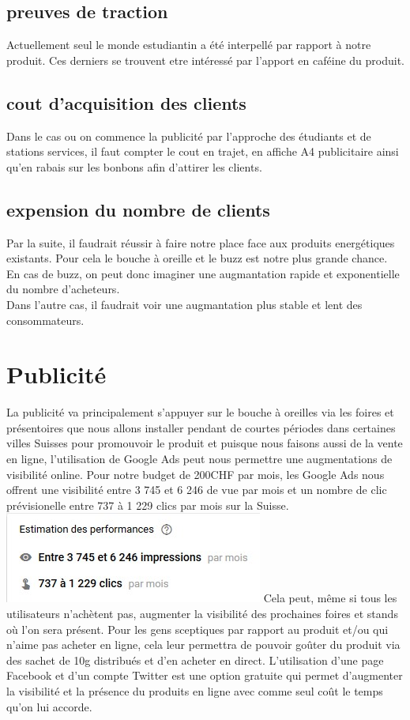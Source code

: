\documentclass[12pt]{article}
\begin{document}
\subsection{preuves de traction}
Actuellement seul le monde estudiantin a été interpellé par rapport à notre produit. Ces derniers se trouvent etre intéressé par l'apport en caféine du produit.
\subsection{cout d'acquisition des clients}
Dans le cas ou on commence la publicité par l'approche des étudiants et de stations services, il faut compter le cout en trajet, en affiche A4 publicitaire ainsi qu'en rabais sur les bonbons afin d'attirer les clients.

\subsection{expension du nombre de clients}
Par la suite, il faudrait réussir à faire notre place face aux produits energétiques existants. Pour cela le bouche à oreille et le buzz est notre plus grande chance.\\
En cas de buzz, on peut donc imaginer une augmantation rapide et exponentielle du nombre d'acheteurs.\\
Dans l'autre cas, il faudrait voir une augmantation plus stable et lent des consommateurs.

\section{Publicité}
La publicité va principalement s'appuyer sur le bouche à oreilles via les foires et présentoires que nous allons installer pendant de courtes périodes dans certaines villes Suisses pour promouvoir le produit et puisque nous faisons aussi de la vente en ligne, l'utilisation de Google Ads peut nous permettre une augmentations de visibilité online. Pour notre budget de 200CHF par mois, les Google Ads nous offrent une visibilité entre 3 745 et 6 246 de vue par mois et un nombre de clic prévisionelle entre 737 à 1 229 clics par mois sur la Suisse. 
\includegraphics[scale=0.4]{../img/googleAdsPrevision.jpg} 
Cela peut, même si tous les utilisateurs n'achètent pas, augmenter la visibilité des prochaines foires et stands où l'on sera présent. Pour les gens sceptiques par rapport au produit et/ou qui n'aime pas acheter en ligne, cela leur permettra de pouvoir goûter du produit via des sachet de 10g distribués et d'en acheter en direct.
L'utilisation d'une page Facebook et d'un compte Twitter est une option gratuite qui permet d'augmenter la visibilité et la présence du produits en ligne avec comme seul coût le temps qu'on lui accorde. 
\end{document}
